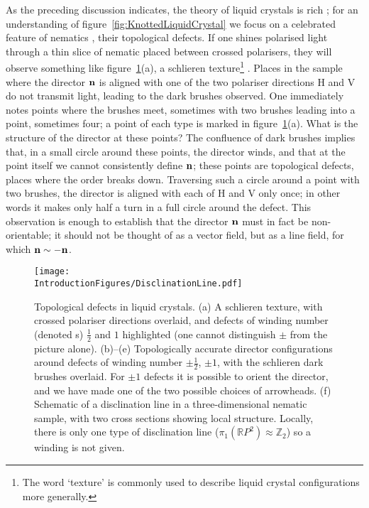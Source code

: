 As the preceding discussion indicates, the theory of liquid crystals is rich \citep{deGennes1992}; for an understanding of figure~\ref{fig:KnottedLiquidCrystal} we focus on a celebrated feature of nematics \citep{Frank1958}, their topological defects. If one shines polarised light through a thin slice of nematic placed between crossed polarisers, they will observe something like figure~\ref{fig:Disclination}(a), a schlieren texture\footnote{The word `texture' is commonly used to describe liquid crystal configurations more generally.} \citep{deGennes1992}. Places in the sample where the director $\bf n$ is aligned with one of the two polariser directions H and V do not transmit light, leading to the dark brushes observed. One immediately notes points where the brushes meet, sometimes with two brushes leading into a point, sometimes four; a point of each type is marked in figure~\ref{fig:Disclination}(a). What is the structure of the director at these points? The confluence of dark brushes implies that, in a small circle around these points, the director winds, and that at the point itself we cannot consistently define $\bf n$; these points are topological defects, places where the order breaks down. Traversing such a circle around a point with two brushes, the director is aligned with each of H and V only once; in other words it makes only half a turn in a full circle around the defect. This observation is enough to establish that the director $\bf{n}$ must in fact be non-orientable; it should not be thought of as a vector field, but as a line field, for which $\bf n \sim - \bf n$.
\begin{figure}[htp]
\centering
\texttt{[image: \\IntroductionFigures/DisclinationLine.pdf]}
\caption[Topological defects in liquid crystals.]{Topological defects in liquid crystals. (a) A schlieren texture, with crossed polariser directions overlaid, and defects of winding number (denoted s) $\frac{1}{2}$ and $1$ highlighted (one cannot distinguish $\pm$ from the picture alone). (b)--(e) Topologically accurate director configurations around defects of winding number $\pm \frac{1}{2}$, $\pm1$, with the schlieren dark brushes overlaid. For $\pm1$ defects it is possible to orient the director, and we have made one of the two possible choices of arrowheads. (f) Schematic of a disclination line in a three-dimensional nematic sample, with two cross sections showing local structure. Locally, there is only one type of disclination line ($\pi_1(\mathbb{R}P^2) \approx \mathbb{Z}_2$) so a winding is not given.}
\label{fig:Disclination}
\end{figure}
